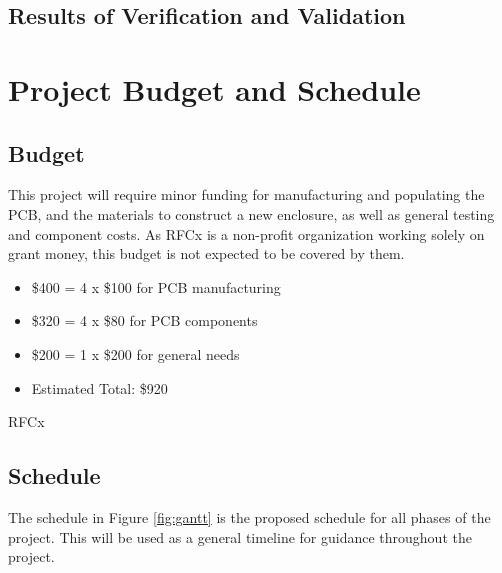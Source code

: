 \documentclass{article}
\numberwithin{figure}{section}
\numberwithin{equation}{section}
\begin{document}
{\subsubsection{}

\subsection{Results of Verification and Validation}\label{conclusion-vv}

\section{Project Budget and Schedule} \label{sect:budgetandschedule}
\subsection{Budget} \label{sect:budget}
This project will require minor funding for manufacturing and populating the PCB, and the materials to construct a new enclosure, as well as general testing and component costs. As RFCx is a non-profit organization working solely on grant money, this budget is not expected to be covered by them.
\begin{itemize}
\item \$400 = 4 x \$100 for PCB manufacturing
\item \$320 = 4 x \$80 for PCB components
\item \$200 = 1 x \$200 for general needs
\item Estimated Total: \$920
\end{itemize}

RFCx

\begin{landscape}
\subsection{Schedule} \label{sect:schedule}
The schedule in Figure \ref{fig:gantt} is the proposed schedule for all phases of the project. This will be used as a general timeline for guidance throughout the project.


\end{landscape}}
\end{document}
